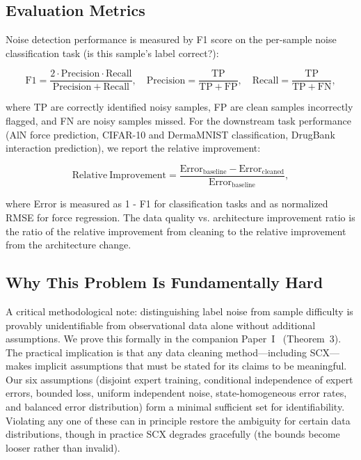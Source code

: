\subsection{Evaluation Metrics}

Noise detection performance is measured by F1 score on the per-sample noise classification task (is this sample's label correct?):

\begin{equation}
\mathrm{F1} = \frac{2 \cdot \mathrm{Precision} \cdot \mathrm{Recall}}{\mathrm{Precision} + \mathrm{Recall}}, \quad
\mathrm{Precision} = \frac{\mathrm{TP}}{\mathrm{TP} + \mathrm{FP}}, \quad
\mathrm{Recall} = \frac{\mathrm{TP}}{\mathrm{TP} + \mathrm{FN}},
\label{eq:f1}
\end{equation}

where TP are correctly identified noisy samples, FP are clean samples incorrectly flagged, and FN are noisy samples missed. For the downstream task performance (AlN force prediction, CIFAR-10 and DermaMNIST classification, DrugBank interaction prediction), we report the relative improvement:

\begin{equation}
\mathrm{Relative~Improvement} = \frac{\mathrm{Error_{baseline}} - \mathrm{Error_{cleaned}}}{\mathrm{Error_{baseline}}},
\label{eq:relative_improvement}
\end{equation}

where Error is measured as 1 - F1 for classification tasks and as normalized RMSE for force regression. The data quality vs. architecture improvement ratio is the ratio of the relative improvement from cleaning to the relative improvement from the architecture change.

\subsection{Why This Problem Is Fundamentally Hard}

A critical methodological note: distinguishing label noise from sample difficulty is provably unidentifiable from observational data alone without additional assumptions. We prove this formally in the companion Paper~I~\cite{xi2025fundamental} (Theorem~3). The practical implication is that any data cleaning method---including SCX---makes implicit assumptions that must be stated for its claims to be meaningful. Our six assumptions (disjoint expert training, conditional independence of expert errors, bounded loss, uniform independent noise, state-homogeneous error rates, and balanced error distribution) form a minimal sufficient set for identifiability. Violating any one of these can in principle restore the ambiguity for certain data distributions, though in practice SCX degrades gracefully (the bounds become looser rather than invalid).

